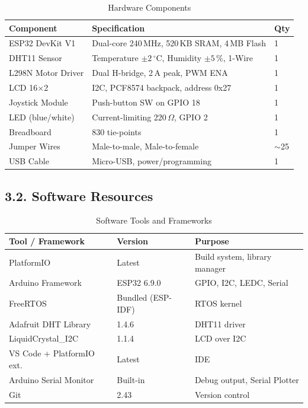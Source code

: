 \documentclass[12pt]{article}
\begin{document}
\begin{table}[H]
    \centering
    \caption{Hardware Components}
    \begin{tabular}{|l|l|l|}
        \hline
        \textbf{Component} & \textbf{Specification} & \textbf{Qty} \\
        \hline
        ESP32 DevKit V1 & Dual-core 240\,MHz, 520\,KB SRAM, 4\,MB Flash & 1 \\
        \hline
        DHT11 Sensor & Temperature $\pm2\,^\circ$C, Humidity $\pm5\,\%$, 1-Wire & 1 \\
        \hline
        L298N Motor Driver & Dual H-bridge, 2\,A peak, PWM ENA & 1 \\
        \hline
        LCD 16$\times$2 & I2C, PCF8574 backpack, address 0x27 & 1 \\
        \hline
        Joystick Module & Push-button SW on GPIO 18 & 1 \\
        \hline
        LED (blue/white) & Current-limiting 220\,$\Omega$, GPIO 2 & 1 \\
        \hline
        Breadboard & 830 tie-points & 1 \\
        \hline
        Jumper Wires & Male-to-male, Male-to-female & $\sim$25 \\
        \hline
        USB Cable & Micro-USB, power/programming & 1 \\
        \hline
    \end{tabular}
\end{table}

\subsection*{3.2. Software Resources}

\begin{table}[H]
    \centering
    \caption{Software Tools and Frameworks}
    \begin{tabular}{|l|l|l|}
        \hline
        \textbf{Tool / Framework} & \textbf{Version} & \textbf{Purpose} \\
        \hline
        PlatformIO & Latest & Build system, library manager \\
        \hline
        Arduino Framework & ESP32 6.9.0 & GPIO, I2C, LEDC, Serial \\
        \hline
        FreeRTOS & Bundled (ESP-IDF) & RTOS kernel \\
        \hline
        Adafruit DHT Library & 1.4.6 & DHT11 driver \\
        \hline
        LiquidCrystal\_I2C & 1.1.4 & LCD over I2C \\
        \hline
        VS Code + PlatformIO ext. & Latest & IDE \\
        \hline
        Arduino Serial Monitor & Built-in & Debug output, Serial Plotter \\
        \hline
        Git & 2.43 & Version control \\
        \hline
    \end{tabular}
\end{table}
\end{document}
